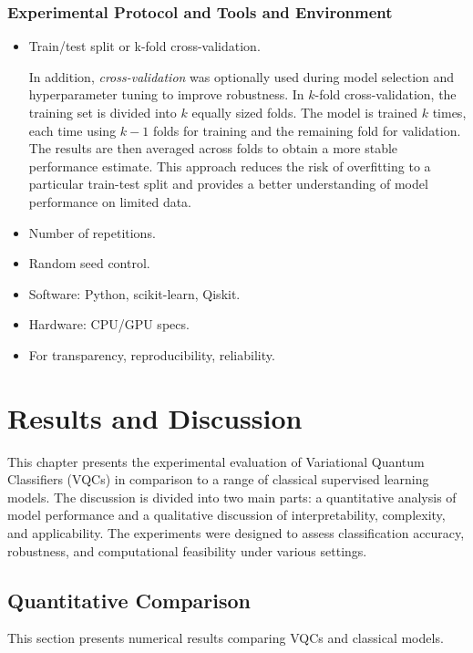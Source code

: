 \subsection{Experimental Protocol and Tools and Environment}
\begin{itemize}
    \item Train/test split or k-fold cross-validation.
    
In addition, \textit{cross-validation} was optionally used during model selection and hyperparameter tuning to improve robustness. In $k$-fold cross-validation, the training set is divided into $k$ equally sized folds. The model is trained $k$ times, each time using $k-1$ folds for training and the remaining fold for validation. The results are then averaged across folds to obtain a more stable performance estimate. This approach reduces the risk of overfitting to a particular train-test split and provides a better understanding of model performance on limited data.

    \item Number of repetitions.
    \item Random seed control.
    \item Software: Python, scikit-learn, Qiskit.
    \item Hardware: CPU/GPU specs.
    \item For transparency, reproducibility, reliability.
\end{itemize}


\chapter{Results and Discussion}
\label{chap:results}

This chapter presents the experimental evaluation of Variational Quantum Classifiers (VQCs) in comparison to a range of classical supervised learning models. The discussion is divided into two main parts: a quantitative analysis of model performance and a qualitative discussion of interpretability, complexity, and applicability. The experiments were designed to assess classification accuracy, robustness, and computational feasibility under various settings.


\section{Quantitative Comparison}
\label{sec:quantitative}

This section presents numerical results comparing VQCs and classical models.

